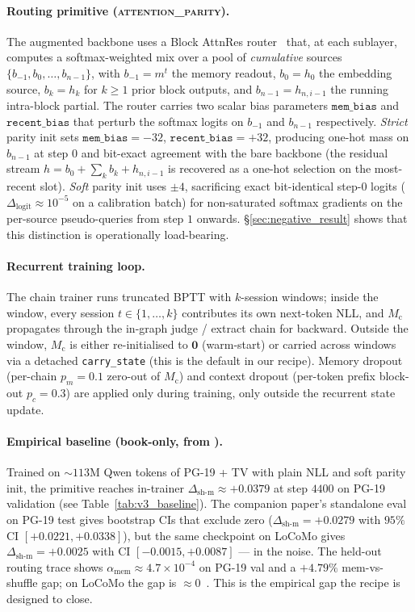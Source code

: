 \documentclass{article}
\newcommand{\Mc}{M_{\text{c}}}
\newcommand{\dsh}{\Delta_{\text{sh-m}}}
\newcommand{\amem}{\alpha_{\text{mem}}}
\begin{document}
\paragraph{Routing primitive (\textsc{attention\_parity}).} The
augmented backbone uses a Block AttnRes
router~\cite{du2025blockattnres} that, at each sublayer, computes
a softmax-weighted mix over a pool of \emph{cumulative} sources
$\{b_{-1}, b_0, \dots, b_{n-1}\}$, with $b_{-1}{=}m^t$ the memory
readout, $b_0{=}h_0$ the embedding source, $b_k{=}h_k$ for $k\!\ge\!1$
prior block outputs, and $b_{n-1}{=}h_{n,i-1}$ the running
intra-block partial. The router carries two scalar bias parameters
$\texttt{mem\_bias}$ and $\texttt{recent\_bias}$ that perturb the
softmax logits on $b_{-1}$ and $b_{n-1}$ respectively. \emph{Strict}
parity init sets $\texttt{mem\_bias}{=}{-32}$,
$\texttt{recent\_bias}{=}{+32}$, producing one-hot mass on $b_{n-1}$
at step $0$ and bit-exact agreement with the bare backbone (the
residual stream $h{=}b_0 + \sum_k b_k + h_{n,i-1}$ is recovered as
a one-hot selection on the most-recent slot). \emph{Soft} parity
init uses $\pm 4$, sacrificing exact bit-identical step-0 logits
($\Delta_{\text{logit}} \approx 10^{-5}$ on a calibration batch) for
non-saturated softmax gradients on the per-source pseudo-queries
from step $1$ onwards. \S\ref{sec:negative_result} shows that this
distinction is operationally load-bearing.

\paragraph{Recurrent training loop.}
The chain trainer runs truncated BPTT with $k$-session windows;
inside the window, every session $t \in \{1,\dots,k\}$ contributes
its own next-token NLL, and $\Mc$ propagates through the in-graph
judge / extract chain for backward. Outside the window, $\Mc$ is
either re-initialised to $\mathbf{0}$ (warm-start) or carried
across windows via a detached \texttt{carry\_state} (this is the
default in our recipe). Memory dropout (per-chain $p_m{=}0.1$
zero-out of $\Mc$) and context dropout (per-token prefix block-out
$p_c{=}0.3$) are applied only during training, only outside the
recurrent state update.

\paragraph{Empirical baseline (book-only, from \cite{liu2025drop}).}
Trained on $\sim$$113$M Qwen tokens of PG-19 + TV with plain NLL
and soft parity init, the primitive reaches in-trainer
$\dsh \approx +0.0379$ at step $4400$ on PG-19 validation
(see Table~\ref{tab:v3_baseline}). The companion paper's standalone
eval on PG-19 test gives bootstrap CIs that exclude zero ($\dsh =
+0.0279$ with $95\%$ CI $[+0.0221, +0.0338]$), but the same
checkpoint on LoCoMo gives $\dsh = +0.0025$ with CI
$[-0.0015, +0.0087]$ --- in the noise. The held-out routing trace
shows $\amem \approx 4.7\!\times\!10^{-4}$ on PG-19 val and a
$+4.79\%$ mem-vs-shuffle gap; on LoCoMo the gap is
$\approx 0$~\cite[Tables~6--7]{liu2025drop}. This is the empirical
gap the recipe is designed to close.
\end{document}
